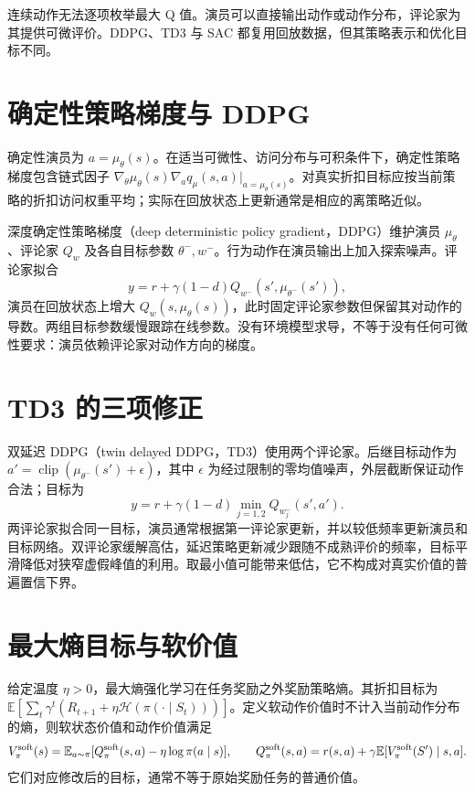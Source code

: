\documentclass[UTF8,12pt,a4paper,fontset=fandol]{ctexbook}
\begin{document}
连续动作无法逐项枚举最大 Q 值。演员可以直接输出动作或动作分布，评论家为其提供可微评价。DDPG、TD3 与 SAC 都复用回放数据，但其策略表示和优化目标不同\cite{lillicrap-ddpg,fujimoto-td3,haarnoja-sac}。

\section{确定性策略梯度与 DDPG}

确定性演员为 $a=\mu_\theta(s)$。在适当可微性、访问分布与可积条件下，确定性策略梯度包含链式因子 $\nabla_\theta\mu_\theta(s)\nabla_aq_\mu(s,a)|_{a=\mu_\theta(s)}$。对真实折扣目标应按当前策略的折扣访问权重平均；实际在回放状态上更新通常是相应的离策略近似\cite{silver-dpg}。

深度确定性策略梯度（deep deterministic policy gradient，DDPG）维护演员 $\mu_\theta$、评论家 $Q_w$ 及各自目标参数 $\theta^-,w^-$。行为动作在演员输出上加入探索噪声。评论家拟合
\[
y=r+\gamma(1-d)Q_{w^-}(s',\mu_{\theta^-}(s')),
\]
演员在回放状态上增大 $Q_w(s,\mu_\theta(s))$，此时固定评论家参数但保留其对动作的导数。两组目标参数缓慢跟踪在线参数。没有环境模型求导，不等于没有任何可微性要求：演员依赖评论家对动作方向的梯度。

\section{TD3 的三项修正}

双延迟 DDPG（twin delayed DDPG，TD3）使用两个评论家。后继目标动作为 $a'=\operatorname{clip}(\mu_{\theta^-}(s')+\epsilon)$，其中 $\epsilon$ 为经过限制的零均值噪声，外层截断保证动作合法；目标为
\[
y=r+\gamma(1-d)\min_{j=1,2}Q_{w_j^-}(s',a').
\]
两评论家拟合同一目标，演员通常根据第一评论家更新，并以较低频率更新演员和目标网络。双评论家缓解高估，延迟策略更新减少跟随不成熟评价的频率，目标平滑降低对狭窄虚假峰值的利用。取最小值可能带来低估，它不构成对真实价值的普遍置信下界。

\section{最大熵目标与软价值}

给定温度 $\eta>0$，最大熵强化学习在任务奖励之外奖励策略熵。其折扣目标为 $\mathbb E[\sum_t\gamma^t(R_{t+1}+\eta\mathcal H(\pi(\cdot\mid S_t)))]$。定义软动作价值时不计入当前动作分布的熵，则软状态价值和动作价值满足
\[
V_\pi^{\rm soft}(s)=\mathbb E_{a\sim\pi}[Q_\pi^{\rm soft}(s,a)-\eta\log\pi(a\mid s)],\qquad
Q_\pi^{\rm soft}(s,a)=r(s,a)+\gamma\mathbb E[V_\pi^{\rm soft}(S')\mid s,a].
\]
它们对应修改后的目标，通常不等于原始奖励任务的普通价值。
\end{document}
